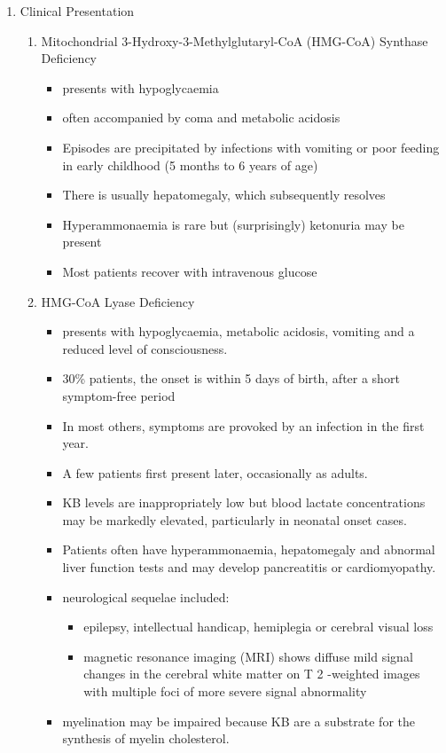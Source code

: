 \documentclass{scrartcl}
\begin{document}
\begin{enumerate}
\item Clinical Presentation
\label{sec:org6ef4a71}
\begin{enumerate}
\item Mitochondrial 3-Hydroxy-3-Methylglutaryl-CoA (HMG-CoA) Synthase Deficiency
\label{sec:org83ee3c3}
\begin{itemize}
\item presents with hypoglycaemia
\item often accompanied by coma and metabolic acidosis
\item Episodes are precipitated by infections with vomiting or poor
feeding in early childhood (5 months to 6 years of age)
\item There is usually hepatomegaly, which subsequently resolves
\item Hyperammonaemia is rare but (surprisingly) ketonuria may be present
\item Most patients recover with intravenous glucose
\end{itemize}

\item HMG-CoA Lyase Deficiency
\label{sec:org4e02676}
\begin{itemize}
\item presents with hypoglycaemia, metabolic acidosis, vomiting and a
reduced level of consciousness.
\item 30\% patients, the onset is within 5 days of birth, after a short symptom-free period
\item In most others, symptoms are provoked by an infection in the first year.
\item A few patients first present later, occasionally as adults.
\item KB levels are inappropriately low but blood lactate concentrations
may be markedly elevated, particularly in neonatal onset cases.
\item Patients often have hyperammonaemia, hepatomegaly and abnormal liver
function tests and may develop pancreatitis or cardiomyopathy.
\item neurological sequelae included:
\begin{itemize}
\item epilepsy, intellectual handicap, hemiplegia or cerebral visual loss
\item magnetic resonance imaging (MRI) shows diffuse mild signal changes
in the cerebral white matter on T 2 -weighted images with multiple
foci of more severe signal abnormality
\end{itemize}
\item myelination may be impaired because KB are a substrate for the
synthesis of myelin cholesterol.
\end{itemize}
\end{enumerate}


\end{enumerate}
\end{document}
